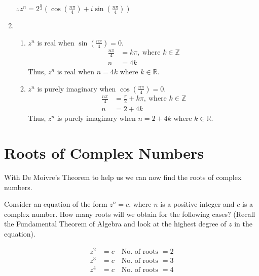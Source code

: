 \documentclass[11pt,a4paper]{book}
\newcommand{\R}{\mathbb{R}}
\newcommand{\Z}{\mathbb{Z}}
\begin{document}
\begin{example}
\begin{enumerate}[label=(\alph*)]
$\therefore{\displaystyle z^{n}=2^{\frac{n}{2}}\left(\cos\left(\frac{n\pi}{4}\right)+i\sin\left(\frac{n\pi}{4}\right)\right)}$

\item

\begin{enumerate}[label=(\roman*)]

\item  $z^{n}$ is real when ${\displaystyle \sin\left(\frac{n\pi}{4}\right)=0}$.
\begin{align*}
\frac{n\pi}{4} & =k\pi,\:\text{where }k\in\Z\\
n & =4k
\end{align*}
Thus, $z^{n}$ is real when $n=4k$ where $k\in\R$.

\item  $z^{n}$ is purely imaginary when ${\displaystyle \cos\left(\frac{n\pi}{4}\right)=0}$.
\begin{align*}
\frac{n\pi}{4} & =\frac{\pi}{2}+k\pi,\:\text{where }k\in\Z\\
n & =2+4k
\end{align*}
Thus, $z^{n}$ is purely imaginary when $n=2+4k$ where $k\in\R$.

\end{enumerate}

\end{enumerate}

\end{example}


\newpage

\section[Roots of Complex Numbers (Not in Syllabus)]{Roots of Complex Numbers}

With De Moivre's Theorem to help us we can now find the roots of complex
numbers.

Consider an equation of the form $z^{n}=c$, where $n$ is a positive
integer and $c$ is a complex number. How many roots will we obtain
for the following cases? (Recall the Fundamental Theorem of Algebra
and look at the highest degree of $z$ in the equation).

\begin{align*}
z^{2} & =c\quad\text{No. of roots }=2\\
z^{3} & =c\quad\text{No. of roots }=3\\
z^{4} & =c\quad\text{No. of roots }=4
\end{align*}
\end{document}

